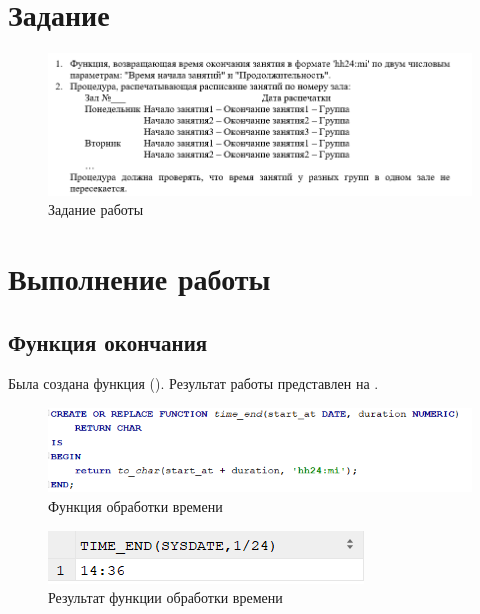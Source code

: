 \documentclass[a4paper,14pt]{article}
\begin{document}

\tableofcontents
\pagebreak

\section{Задание}

\begin{figure}[H]
	\centering		
	\includegraphics[width=\linewidth]{image/6_task}
	\caption{Задание работы}\label{img:6_task}
\end{figure}

\section{Выполнение работы}

\subsection{Функция окончания}
	Была создана функция ().
	Результат работы представлен на .
	
	\begin{figure}[H]
		\centering		
		\includegraphics[width=0.8\linewidth]{image/6_func}
		\caption{Функция обработки времени}\label{img:6_func}
	\end{figure}

 	\begin{figure}[H]
	 	\centering		
	 	\includegraphics[width=0.8\linewidth]{image/6_func_result}
	 	\caption{Результат функции обработки времени}\label{img:6_func_result}
	 \end{figure}
 
\end{document}
